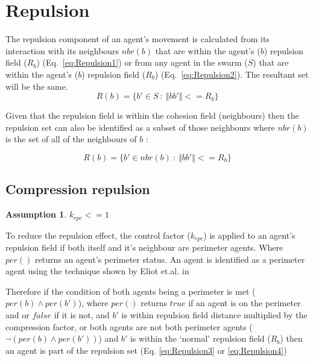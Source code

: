 \documentclass[12pt,a4paper]{article}
\newtheorem{assumption}{Assumption}
\newcommand{\magn}[1]{\Vert{#1}\Vert}
\begin{document}
\section{Repulsion}\label{repulsion}
The repulsion component of an agent's movement is calculated from its interaction with its neighbours $nbr(b)$ that are within the agent's ($b$) repulsion field ($R_b$) (Eq.~\ref{eq:Repulsion1}) or from any agent in the swarm ($S$) that are within the agent's ($b$) repulsion field ($R_b$) (Eq.~\ref{eq:Repulsion2}). The resultant set will be the same.\\

\begin{equation}\label{eq:Repulsion1}
R(b) = \{b' \in S~:~\magn{bb'} <= R_b\}
\end{equation}

Given that the repulsion field is within the cohesion field (neighbours) then the repulsion set can also be identified as a subset of those neighbours where $nbr(b)$ is the set of all of the neighbours of $b$ \cite{eliot2017methods}:

\begin{equation}\label{eq:Repulsion2}
R(b) = \{b' \in nbr(b)~:~\magn{bb'} <= R_b\}
\end{equation}

\subsection{Compression repulsion}

\begin{assumption}
	$k_{rpc} <= 1$
\end{assumption}

To reduce the repulsion effect, the control factor ($k_{rpc}$) is applied to an agent's repulsion field if both itself and it's neighbour are perimeter agents. Where $per()$ returns an agent's perimeter status. An agent is identified as a perimeter agent using the technique shown by Eliot et.al. in \cite{eliot2019void}

Therefore if the condition of both agents being a perimeter is met ($per(b)\wedge per(b')$), where $per()$ returns $true$ if an agent is on the perimeter and or $false$ if it is not, and $b'$ is within repulsion field distance multiplied by the compression factor, or both agents are not both perimeter agents ($\neg(per(b)\wedge per(b'))$) and $b'$ is within the `normal' repulsion field ($R_b$) then an agent is part of the repulsion set (Eq. \ref{eq:Repulsion3} or \ref{eq:Repulsion4})
\end{document}
